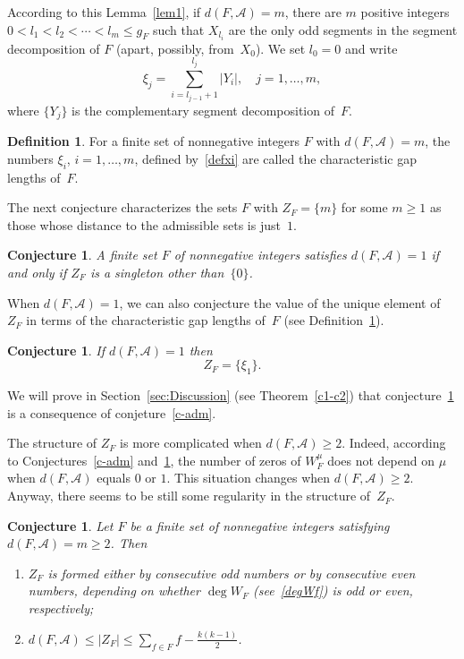 \documentclass[10pt]{article}
\theoremstyle{plain}
\newtheorem{conjecture}[theorem]{Conjecture}
\newtheorem{subconj}[theorem]{Conjecture}%
\theoremstyle{definition}
\newtheorem{definition}[theorem]{Definition}
\numberwithin{equation}{section} %
\newcommand\Ad{\mathcal{A}}
\begin{document}
According to this Lemma~\ref{lem1}, if $d(F,\Ad)=m$, there are $m$ positive integers $0<l_1<l_2<\cdots <l_m\le g_F$ such that $X_{l_i}$ are the only odd segments in the segment decomposition of $F$ (apart, possibly, from~$X_0$). We set $l_0=0$ and write
\begin{equation}\label{defxi}
\xi _j=\sum_{i=l_{j-1}+1}^{l_j}|Y_i|,\quad j=1,\dots,m,
\end{equation}
where $\{Y_j\}$ is the complementary segment decomposition of~$F$.

\begin{definition}\label{clg} 
For a finite set of nonnegative integers $F$ with $d(F,\Ad)=m$, the numbers $\xi _i$, $i=1,\dots, m$, defined by~\eqref{defxi} are called the characteristic gap lengths of~$F$.
\end{definition}

The next conjecture characterizes the sets $F$ with $Z_F=\{m\}$ for some
$m \geq 1$ as those whose distance to the admissible sets is just~$1$.

\begin{conjecture}
\label{c-dist1}
A finite set $F$ of nonnegative integers satisfies $d(F,\Ad)=1$ if and only if $Z_F$ is a singleton other than~$\{0\}$.
\end{conjecture}

When $d(F,\Ad)=1$, we can also conjecture the value of the unique element of $Z_F$ in terms of the characteristic gap lengths
of~$F$ (see Definition~\ref{clg}).

\begin{subconj}
\label{sc-dist1}
If $d(F,\Ad)=1$ then
\[
   Z_F=\{\xi_1\}.
\]
\end{subconj}

We will prove in Section~\ref{sec:Discussion} (see Theorem~\ref{c1-c2}) that conjecture~\ref{sc-dist1} is a consequence of conjeture~\ref{c-adm}.

The structure of $Z_F$ is more complicated when $d(F,\Ad)\ge 2$. Indeed, according to Conjectures~\ref{c-adm} and~\ref{c-dist1}, the number of zeros of $W_F^\mu$ does not depend on $\mu$ when $d(F,\Ad)$ equals $0$ or $1$. This situation changes when $d(F,\Ad)\ge 2$. Anyway, there seems to be still some regularity in the structure of~$Z_F$.

\begin{conjecture}\label{c-ZFd}
Let $F$ be a finite set of nonnegative integers satisfying $d(F,\Ad)=m\ge 2$. Then
\begin{enumerate}
\item $Z_F$ is formed either by consecutive odd numbers or by consecutive even numbers, depending on whether $\deg W_F$ (see~\eqref{degWf}) is odd or even, respectively;
\item $d(F,\Ad)\le |Z_F|\le \sum_{f\in F}f-\frac{k(k-1)}{2}$.
\end{enumerate}
\end{conjecture}
\end{document}
